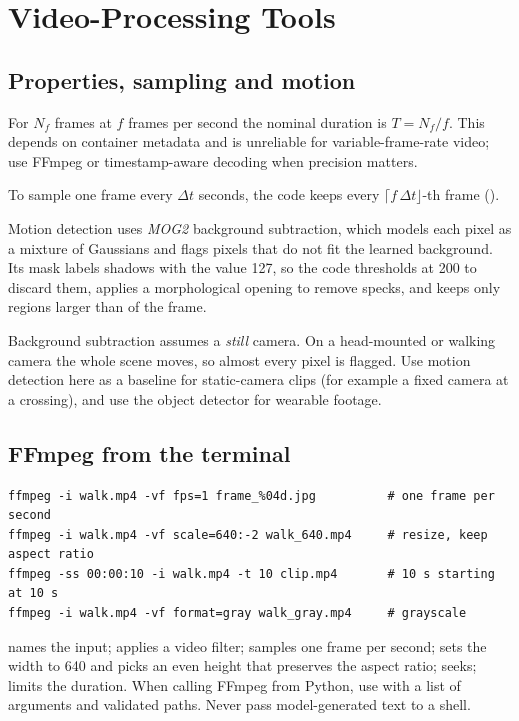 \chapter{Video-Processing Tools}
\section{Properties, sampling and motion}
For $N_f$ frames at $f$ frames per second the nominal duration is $T=N_f/f$. This depends on container metadata and is unreliable for variable-frame-rate video; use FFmpeg or timestamp-aware decoding when precision matters.

To sample one frame every $\Delta t$ seconds, the code keeps every $\lceil f\,\Delta t\rfloor$-th frame ().

Motion detection uses \emph{MOG2} background subtraction, which models each pixel as a mixture of Gaussians and flags pixels that do not fit the learned background. Its mask labels shadows with the value 127, so the code thresholds at 200 to discard them, applies a morphological opening to remove specks, and keeps only regions larger than  of the frame.

\begin{warnbox}
Background subtraction assumes a \emph{still} camera. On a head-mounted or walking camera the whole scene moves, so almost every pixel is flagged. Use motion detection here as a baseline for static-camera clips (for example a fixed camera at a crossing), and use the object detector for wearable footage.
\end{warnbox}



\section{FFmpeg from the terminal}
\begin{lstlisting}[style=sh]
ffmpeg -i walk.mp4 -vf fps=1 frame_%04d.jpg          # one frame per second
ffmpeg -i walk.mp4 -vf scale=640:-2 walk_640.mp4     # resize, keep aspect ratio
ffmpeg -ss 00:00:10 -i walk.mp4 -t 10 clip.mp4       # 10 s starting at 10 s
ffmpeg -i walk.mp4 -vf format=gray walk_gray.mp4     # grayscale
\end{lstlisting}
 names the input;  applies a video filter;  samples one frame per second;  sets the width to 640 and picks an even height that preserves the aspect ratio;  seeks;  limits the duration. When calling FFmpeg from Python, use  with a list of arguments and validated paths. Never pass model-generated text to a shell.

